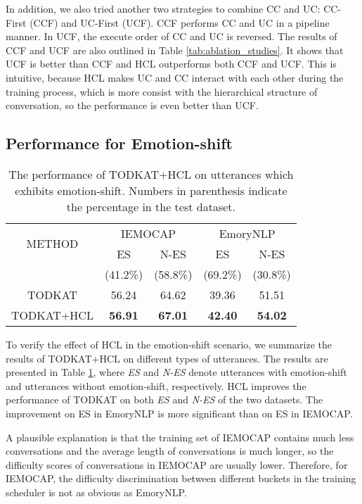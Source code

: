 \documentclass[letterpaper]{article} \usepackage{aaai22}  \usepackage{times}  \usepackage{helvet}  \usepackage{courier}  \usepackage[hyphens]{url}  \usepackage{graphicx} \urlstyle{rm} \def\UrlFont{\rm}  \usepackage{natbib}  \usepackage{caption} \DeclareCaptionStyle{ruled}{labelfont=normalfont,labelsep=colon,strut=off} \frenchspacing  \setlength{\pdfpagewidth}{8.5in}  \setlength{\pdfpageheight}{11in}
\begin{document}
In addition, we also tried another two strategies to combine CC and UC: CC-First (CCF) and UC-First (UCF). CCF performs CC and UC in a pipeline manner. In UCF, the execute order of CC and UC is reversed. The results of CCF and UCF are also outlined in Table \ref{tab:ablation_studies}. It shows that UCF is better than CCF and HCL  outperforms both CCF and UCF. This is intuitive, because  HCL makes UC and CC interact with each other during the training process, which is more consist with the hierarchical structure of conversation, so the performance is even better than UCF.


\subsection{Performance for Emotion-shift}


\begin{table}[h]
	\centering
	\footnotesize
	\begin{tabular}{c|c|c|c|c}
		
		\toprule
		
		\multirow{2}{*}{METHOD} & \multicolumn{2}{c|}{IEMOCAP}  & \multicolumn{2}{c}{EmoryNLP}\\ 
		& ES & N-ES &  ES & N-ES\\
		& (41.2\%) & (58.8\%) & (69.2\%) & (30.8\%) \\
		\midrule
		TODKAT & 56.24 & 64.62 & 39.36 & 51.51\\
		TODKAT+HCL & \bf{56.91} & \bf{67.01} & \bf{42.40} & \bf{54.02}\\ 
		
		\bottomrule
	\end{tabular}
	\caption{The performance of TODKAT+HCL on utterances which exhibits emotion-shift. Numbers in parenthesis indicate the percentage in the test dataset.} \label{tab:es}  
\end{table}




To verify the effect of HCL in the emotion-shift scenario, we summarize the results of TODKAT+HCL on different types of utterances. The results are presented in Table \ref{tab:es},  where \emph{ES} and  \emph{N-ES} denote utterances with emotion-shift and utterances without emotion-shift, respectively. HCL improves the performance of  TODKAT on both  \emph{ES}  and  \emph{N-ES} of the two datasets. The improvement on ES in EmoryNLP is more significant than on ES in IEMOCAP. 

A plausible explanation is that the training set of IEMOCAP contains much less conversations and the average length of conversations is much longer, so the difficulty scores of conversations in IEMOCAP are usually lower. Therefore, for IEMOCAP, the difficulty discrimination between different buckets in the training scheduler is not as obvious as EmoryNLP.
\end{document}
